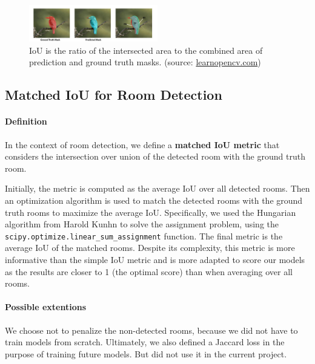 \documentclass[11pt]{article}
\begin{document}
\begin{figure}[hb!]
    \centering
    \includegraphics[width=0.5\textwidth]{figures/5-segmentation-iou.jpg}
    \caption{IoU is the ratio of the intersected area to the combined area of
     prediction and ground truth masks. 
     (source: \href{https://learnopencv.com/intersection-over-union-iou-in-object-detection-and-segmentation/}
        {learnopencv.com})}
    \label{fig:iou_segmentation}
\end{figure}

\subsection{Matched IoU for Room Detection}
\paragraph{Definition} In the context of room detection, we define a \textbf{matched IoU
metric} that considers the intersection over union of the detected room with the
ground truth room. 

Initially, the metric is computed as the average IoU over all detected rooms.
Then an optimization algorithm is used to match the detected rooms with the ground truth rooms
to maximize the average IoU. Specifically, we used the Hungarian algorithm from 
Harold Kunhn to solve the
assignment problem, using the \texttt{scipy.optimize.linear\_sum\_assignment} function.
The final metric is the average IoU of the matched rooms.
Despite its complexity, this metric is more informative than the simple IoU metric 
and is more adapted to score our models as the results are closer to 1 (the 
optimal score) than when averaging over all rooms.

\paragraph{Possible extentions}
We choose not to penalize the non-detected rooms, because we 
did not have to train models from scratch. Ultimately, we also defined a Jaccard 
loss in the purpose of training future models. But did 
not use it in the current project.

\end{document}
